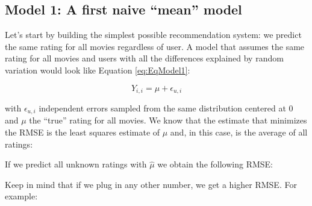 \documentclass[
]{article}
\newenvironment{Shaded}{}{}
\newcommand{\DecValTok}[1]{\textcolor[rgb]{0.25,0.63,0.44}{#1}}
\newcommand{\FloatTok}[1]{\textcolor[rgb]{0.25,0.63,0.44}{#1}}
\newcommand{\FunctionTok}[1]{\textcolor[rgb]{0.02,0.16,0.49}{#1}}
\newcommand{\NormalTok}[1]{#1}
\newcommand{\OtherTok}[1]{\textcolor[rgb]{0.00,0.44,0.13}{#1}}
\newcommand{\SpecialCharTok}[1]{\textcolor[rgb]{0.25,0.44,0.63}{#1}}
\begin{document}
\newpage

\hypertarget{model-1-a-first-naive-mean-model}{%
\subsection{Model 1: A first naive ``mean''
model}\label{model-1-a-first-naive-mean-model}}

Let's start by building the simplest possible recommendation system: we
predict the same rating for all movies regardless of user. A model that
assumes the same rating for all movies and users with all the
differences explained by random variation would look like Equation
\ref{eq:EqModel1}:

%
\par

\label{eq:EqModel1} \begin{equation}
  Y_{i,i} = \mu + \epsilon_{u,i}
\end{equation}

with \(\epsilon_{u,i}\) independent errors sampled from the same
distribution centered at 0 and \(\mu\) the ``true'' rating for all
movies. We know that the estimate that minimizes the RMSE is the least
squares estimate of \(\mu\) and, in this case, is the average of all
ratings:

\begin{Shaded}
\end{Shaded}

If we predict all unknown ratings with \(\hat\mu\) we obtain the
following RMSE:

\begin{Shaded}
\end{Shaded}

Keep in mind that if we plug in any other number, we get a higher RMSE.
For example:
\end{document}
